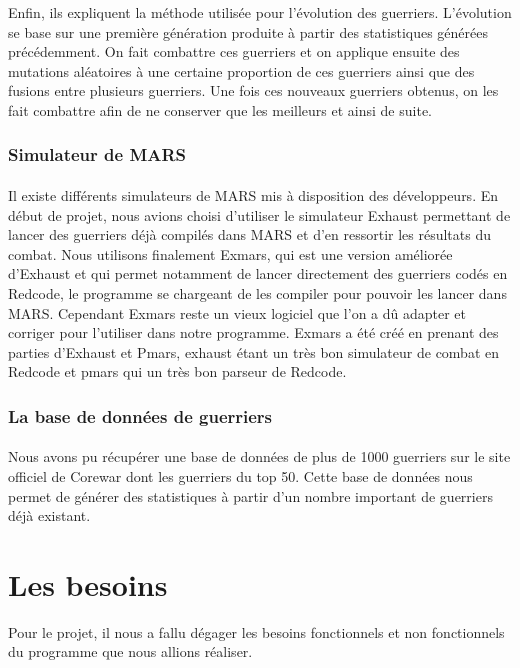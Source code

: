 \documentclass[french]{article}
\begin{document}
            Enfin, ils expliquent la méthode utilisée pour l'évolution des guerriers. L'évolution se base sur une première génération produite à partir des statistiques générées précédemment. On fait combattre ces guerriers et on applique ensuite des mutations aléatoires à une certaine proportion de ces guerriers ainsi que des fusions entre plusieurs guerriers. Une fois ces nouveaux guerriers obtenus, on les fait combattre afin de ne conserver que les meilleurs et ainsi de suite.

        \newpage
        \subsubsection{Simulateur de MARS}
            \paragraph{}Il existe différents simulateurs de MARS mis à disposition des développeurs. En début de projet, nous avions choisi d'utiliser le simulateur Exhaust permettant de lancer des guerriers déjà compilés dans MARS et d'en ressortir les résultats du combat. Nous utilisons finalement Exmars, qui est une version améliorée d'Exhaust et qui permet notamment de lancer directement des guerriers codés en Redcode, le programme se chargeant de les compiler pour pouvoir les lancer dans MARS. Cependant Exmars reste un vieux logiciel que l'on a dû adapter et corriger pour l'utiliser dans notre programme. Exmars a été créé en prenant des parties d'Exhaust et Pmars, exhaust étant un très bon simulateur de combat en Redcode et pmars qui un très bon parseur de Redcode.
            
        \subsubsection{La base de données de guerriers}
            \paragraph{}Nous avons pu récupérer une base de données de plus de 1000 guerriers sur le site officiel de Corewar dont les guerriers du top 50. Cette base de données nous permet de générer des statistiques à partir d'un nombre important de guerriers déjà existant.

\newpage
\section{Les besoins}
    Pour le projet, il nous a fallu dégager les besoins fonctionnels et non fonctionnels du programme que nous allions réaliser.
\end{document}
